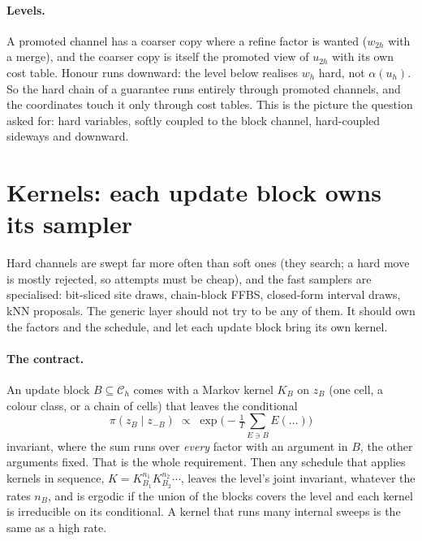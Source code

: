 \documentclass[11pt]{article}
\newcommand{\1}{\mathds{1}}
\newcommand{\Chan}{\mathcal{C}}
\begin{document}
\paragraph{Levels.} A promoted channel has a coarser copy where a refine factor
is wanted ($w_{2h}$ with a merge), and the coarser copy is itself the promoted
view of $u_{2h}$ with its own cost table. Honour runs downward: the level below
realises $w_h$ hard, not $\alpha(u_h)$. So the hard chain of a guarantee runs
entirely through promoted channels, and the coordinates touch it only through
cost tables. This is the picture the question asked for: hard variables, softly
coupled to the block channel, hard-coupled sideways and downward.

\section{Kernels: each update block owns its sampler}
\label{sec:kernels}

Hard channels are swept far more often than soft ones (they search; a hard
move is mostly rejected, so attempts must be cheap), and the fast samplers are
specialised: bit-sliced site draws, chain-block FFBS, closed-form interval
draws, kNN proposals. The generic layer should not try to be any of them. It
should own the factors and the schedule, and let each update block bring its
own kernel.

\paragraph{The contract.} An update block $B \subseteq \Chan_h$ comes with a
Markov kernel $K_B$ on $z_B$ (one cell, a colour class, or a chain of cells)
that leaves the conditional
\[
  \pi(z_B \mid z_{-B}) \;\propto\; \exp\!\Big(-\tfrac1T \sum_{E \ni B} E(\ldots)\Big)
\]
invariant, where the sum runs over \emph{every} factor with an argument in $B$,
the other arguments fixed. That is the whole requirement. Then any schedule
that applies kernels in sequence,
$K = K_{B_1}^{n_1} K_{B_2}^{n_2} \cdots$, leaves the level's joint invariant,
whatever the rates $n_B$, and is ergodic if the union of the blocks covers the
level and each kernel is irreducible on its conditional. A kernel that runs
many internal sweeps is the same as a high rate.
\end{document}
